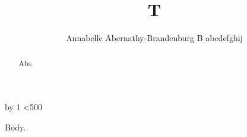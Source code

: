 \documentclass{revtex4-2}
\def\digit#1{\ifcase#1 a\or b\or c\or d\or e\or f\or g\or h\or i\or j\fi}
\def\letters#1{\ifx\relax#1\else\digit#1\expandafter\letters\fi}
\begin{document}
\title{T}
\loop
  \edef\name{Annabelle Abernathy-Brandenburg B\expandafter{}\number\n\relax}
  \expandafter\author\expandafter{\name}
  \advance\n by 1
\ifnum\n<500 \repeat
{}
\begin{abstract}
Abs.
\end{abstract}
\maketitle
Body.
\end{document}
